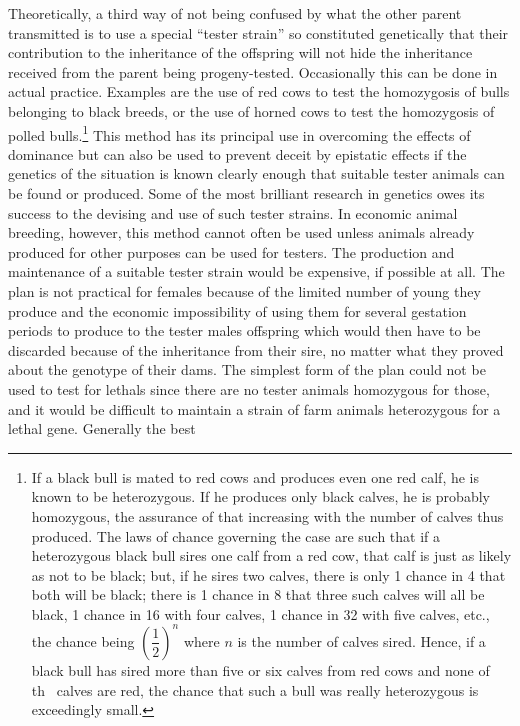 Theoretically, a third way of not being confused by what the other
parent transmitted is to use a special ``tester strain'' so constituted
genetically that their contribution to the inheritance of the offspring
will not hide the inheritance received from the parent being progeny-tested.
Occasionally this can be done in actual practice. Examples are
the use of red cows to test the homozygosis of bulls belonging to black
breeds, or the use of horned cows to test the homozygosis of polled
bulls.\footnote{If a black bull is mated to red cows and produces even one
red calf, he is known to be heterozygous. If he produces only black calves,
he is probably homozygous, the assurance of that increasing with the number
of calves thus produced. The laws of chance governing the case are such that
if a heterozygous black bull sires one calf from a red cow, that calf is just
as likely as not to be black; but, if he sires two calves, there is only 1
chance in 4 that both will be black; there is 1 chance in 8 that three
such calves will all be black, 1 chance in 16 with four calves, 1 chance in 32 with five
calves, etc., the chance being \(\left(\dfrac{1}{2}\right)^n\) where $n$ is the number of calves sired. Hence, if
a black bull has sired more than five or six calves from red cows and none of th~
calves are red, the chance that such a bull was really heterozygous is exceedingly
small.} This method has its principal use in overcoming the effects of
dominance but can also be used to prevent deceit by epistatic effects if
the genetics of the situation is known clearly enough that suitable tester
animals can be found or produced. Some of the most brilliant research
in genetics owes its success to the devising and use of such tester strains.
In economic animal breeding, however, this method cannot often be
used unless animals already produced for other purposes can be used
for testers. The production and maintenance of a suitable tester strain
would be expensive, if possible at all. The plan is not practical for
females because of the limited number of young they produce and
the economic impossibility of using them for several gestation periods
to produce to the tester males offspring which would then have to be
discarded because of the inheritance from their sire, no matter what
they proved about the genotype of their dams. The simplest form of the
plan could not be used to test for lethals since there are no tester animals
homozygous for those, and it would be difficult to maintain a
strain of farm animals heterozygous for a lethal gene. Generally the best
